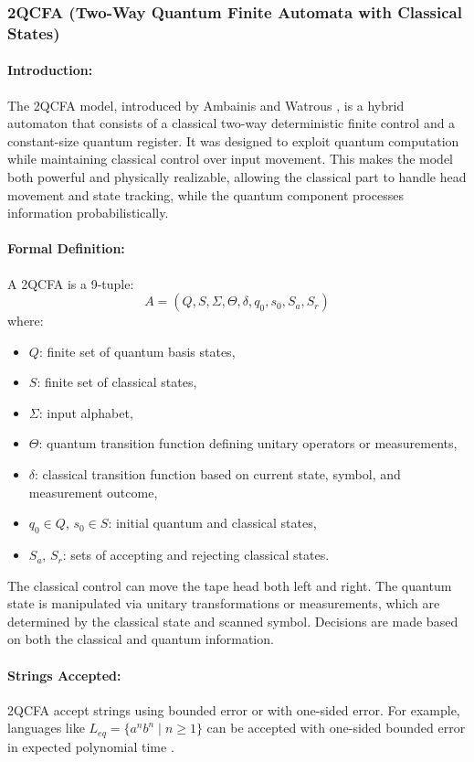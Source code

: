\subsubsection{2QCFA (Two-Way Quantum Finite Automata with Classical States)}

\paragraph{Introduction:}  
The 2QCFA model, introduced by Ambainis and Watrous \cite{ambainis2002two}, is a hybrid automaton that consists of a classical two-way deterministic finite control and a constant-size quantum register. It was designed to exploit quantum computation while maintaining classical control over input movement. This makes the model both powerful and physically realizable, allowing the classical part to handle head movement and state tracking, while the quantum component processes information probabilistically.

\paragraph{Formal Definition:}  
A 2QCFA is a 9-tuple:
\[
A = (Q, S, \Sigma, \Theta, \delta, q_0, s_0, S_a, S_r)
\]
where:
\begin{itemize}
    \item $Q$: finite set of quantum basis states,
    \item $S$: finite set of classical states,
    \item $\Sigma$: input alphabet,
    \item $\Theta$: quantum transition function defining unitary operators or measurements,
    \item $\delta$: classical transition function based on current state, symbol, and measurement outcome,
    \item $q_0 \in Q$, $s_0 \in S$: initial quantum and classical states,
    \item $S_a$, $S_r$: sets of accepting and rejecting classical states.
\end{itemize}
The classical control can move the tape head both left and right. The quantum state is manipulated via unitary transformations or measurements, which are determined by the classical state and scanned symbol. Decisions are made based on both the classical and quantum information.

\paragraph{Strings Accepted:}  
2QCFA accept strings using bounded error or with one-sided error. For example, languages like $L_{eq} = \{ a^n b^n \mid n \geq 1 \}$ can be accepted with one-sided bounded error in expected polynomial time \cite{ambainis2002two}.

